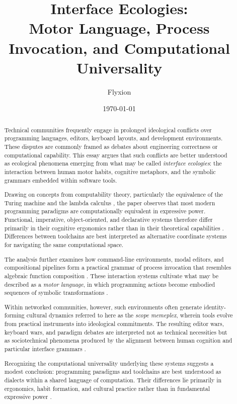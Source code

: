\documentclass[11pt]{article}
\title{Interface Ecologies:\\
\large Motor Language, Process Invocation, and Computational Universality}
\author{Flyxion}
\date{\today}
\theoremstyle{definition}
\begin{document}
\maketitle

\begin{abstract}

Technical communities frequently engage in prolonged ideological
conflicts over programming languages, editors, keyboard layouts, and
development environments. These disputes are commonly framed as debates
about engineering correctness or computational capability. This essay
argues that such conflicts are better understood as ecological
phenomena emerging from what may be called \emph{interface ecologies}:
the interaction between human motor habits, cognitive metaphors, and
the symbolic grammars embedded within software tools.

Drawing on concepts from computability theory, particularly the
equivalence of the Turing machine and the lambda calculus
\cite{church1936,turing1936}, the paper observes that most modern
programming paradigms are computationally equivalent in expressive power.
Functional, imperative, object-oriented, and declarative systems
therefore differ primarily in their cognitive ergonomics rather than in
their theoretical capabilities \cite{backus1978}. Differences between
toolchains are best interpreted as alternative coordinate systems for
navigating the same computational space.

The analysis further examines how command-line environments, modal
editors, and compositional pipelines form a practical grammar of
process invocation that resembles algebraic function composition
\cite{fant2006,ritchie1974}. These interaction systems cultivate what
may be described as a \emph{motor language}, in which programming
actions become embodied sequences of symbolic transformations
\cite{norman1988}.

Within networked communities, however, such environments often generate
identity-forming cultural dynamics referred to here as the
\emph{scope memeplex}, wherein tools evolve from practical instruments
into ideological commitments. The resulting editor wars, keyboard wars,
and paradigm debates are interpreted not as technical necessities but
as sociotechnical phenomena produced by the alignment between human
cognition and particular interface grammars \cite{raymond2003}.

Recognizing the computational universality underlying these systems
suggests a modest conclusion: programming paradigms and toolchains are
best understood as dialects within a shared language of computation.
Their differences lie primarily in ergonomics, habit formation, and
cultural practice rather than in fundamental expressive power
\cite{kleene1952}.

\end{abstract}
\end{document}
